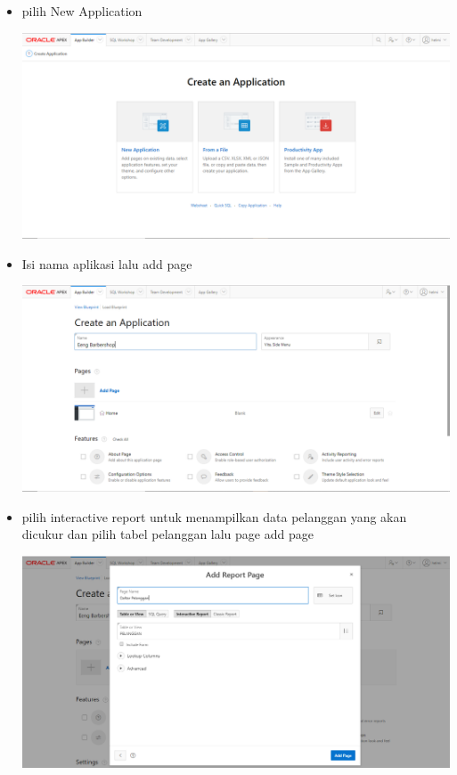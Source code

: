 ﻿\documentclass{article}
\begin{document}
\begin{itemize}
        \item pilih New Application 
        \begin{center}
        \centering
        \includegraphics[scale=0.3]{gambar/5.PNG}
    \end{center}

        \item Isi nama aplikasi lalu add page
        \begin{center}
            \centering
            \includegraphics[scale=0.3]{gambar/10.PNG}
        \end{center}

        \item pilih interactive report untuk menampilkan data pelanggan yang akan dicukur dan pilih tabel pelanggan lalu page add page 
        \begin{center}
            \centering
            \includegraphics[scale=0.3]{gambar/11.PNG}
        \end{center}
        

\end{itemize}
\end{document}
